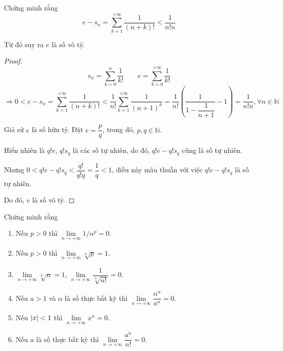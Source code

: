 \documentclass[class=analysis,crop=false]{standalone}
\begin{document}
\begin{exercise}
    Chứng minh rằng
    \[
        e - s_{n} = \sum^{+\infty}_{k=1}\frac{1}{(n+k)!} < \frac{1}{n!n}
    \]
    \par Từ đó suy ra $e$ là số vô tỷ.
\end{exercise}

\begin{proof}
    \[
        s_{n} = \sum^{n}_{k=0}\frac{1}{k!}\qquad e = \sum^{+\infty}_{k=0}\frac{1}{k!}
    \]
    \[
        \Rightarrow 0 < e - s_{n} = \sum^{+\infty}_{k=1}\frac{1}{(n+k)!}  < \frac{1}{n!}\sum^{+\infty}_{k=1}\frac{1}{(n+1)^{k}} = \frac{1}{n!}\left(\frac{1}{1 - \dfrac{1}{n+1}} - 1\right) = \frac{1}{n!n}, \forall n\in\mathbb{N}
    \]
    \par Giả sử $e$ là số hữu tỷ. Đặt $e = \dfrac{p}{q}$, trong đó, $p, q\in\mathbb{N}$.
    \par Hiển nhiên là $q!e$, $q!s_{q}$ là các số tự nhiên, do đó, $q!e - q!s_{q}$ cũng là số tự nhiên.
    \par Nhưng $0 < q!e - q!s_{q} < \dfrac{q!}{q!q} = \dfrac{1}{q} < 1$, điều này mâu thuẫn với việc $q!e - q!s_{q}$ là số tự nhiên.
    \par Do đó, $e$ là số vô tỷ.
\end{proof}

\begin{exercise}
    \par Chứng minh rằng
    \begin{enumerate}[label = (\roman*)]
        \item Nếu $p > 0$ thì $\lim\limits_{n\to+\infty} 1/n^{p} = 0$.
        \item Nếu $p > 0$ thì $\lim\limits_{n\to+\infty} \sqrt[n]{p} = 1$.
        \item $\lim\limits_{n\to+\infty}\sqrt[n]{n} = 1$, $\lim\limits_{n\to+\infty} \dfrac{1}{\sqrt[n]{n!}} = 0$.
        \item Nếu $a > 1$ và $\alpha$ là số thực bất kỳ thì $\lim\limits_{n\to+\infty}\dfrac{n^{\alpha}}{a^{n}} = 0$.
        \item Nếu $\left\vert{x}\right\vert < 1$ thì $\lim\limits_{n\to+\infty} x^{n} = 0$.
        \item Nếu $a$ là số thực bất kỳ thì $\lim\limits_{n\to+\infty} \dfrac{a^{n}}{n!} = 0$.
    \end{enumerate}
\end{exercise}
\end{document}
